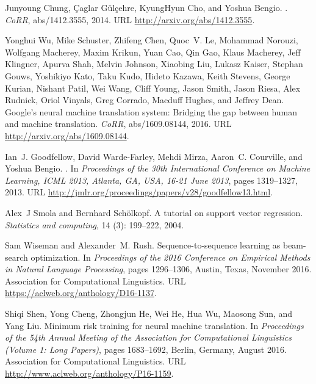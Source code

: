 \documentclass[11pt]{article}
\begin{document}
\begin{thebibliography}{23}
Junyoung Chung, {\c{C}}aglar G{\"{u}}l{\c{c}}ehre, KyungHyun Cho, and Yoshua
  Bengio.
.
\newblock \emph{CoRR}, abs/1412.3555, 2014.
\newblock URL \url{http://arxiv.org/abs/1412.3555}.

Yonghui Wu, Mike Schuster, Zhifeng Chen, Quoc~V. Le, Mohammad Norouzi, Wolfgang
  Macherey, Maxim Krikun, Yuan Cao, Qin Gao, Klaus Macherey, Jeff Klingner,
  Apurva Shah, Melvin Johnson, Xiaobing Liu, Lukasz Kaiser, Stephan Gouws,
  Yoshikiyo Kato, Taku Kudo, Hideto Kazawa, Keith Stevens, George Kurian,
  Nishant Patil, Wei Wang, Cliff Young, Jason Smith, Jason Riesa, Alex Rudnick,
  Oriol Vinyals, Greg Corrado, Macduff Hughes, and Jeffrey Dean.
\newblock Google's neural machine translation system: Bridging the gap between
  human and machine translation.
\newblock \emph{CoRR}, abs/1609.08144, 2016.
\newblock URL \url{http://arxiv.org/abs/1609.08144}.

Ian~J. Goodfellow, David Warde{-}Farley, Mehdi Mirza, Aaron~C. Courville, and
  Yoshua Bengio.
.
\newblock In \emph{Proceedings of the 30th International Conference on Machine
  Learning, {ICML} 2013, Atlanta, GA, USA, 16-21 June 2013}, pages 1319--1327,
  2013.
\newblock URL \url{http://jmlr.org/proceedings/papers/v28/goodfellow13.html}.

Alex~J Smola and Bernhard Sch{\"o}lkopf.
\newblock A tutorial on support vector regression.
\newblock \emph{Statistics and computing}, 14 (3): 199--222,
  2004.

Sam Wiseman and Alexander~M. Rush.
\newblock Sequence-to-sequence learning as beam-search optimization.
\newblock In \emph{Proceedings of the 2016 Conference on Empirical Methods in
  Natural Language Processing}, pages 1296--1306, Austin, Texas, November 2016.
  Association for Computational Linguistics.
\newblock URL \url{https://aclweb.org/anthology/D16-1137}.

Shiqi Shen, Yong Cheng, Zhongjun He, Wei He, Hua Wu, Maosong Sun, and Yang Liu.
\newblock Minimum risk training for neural machine translation.
\newblock In \emph{Proceedings of the 54th Annual Meeting of the Association
  for Computational Linguistics (Volume 1: Long Papers)}, pages 1683--1692,
  Berlin, Germany, August 2016. Association for Computational Linguistics.
\newblock URL \url{http://www.aclweb.org/anthology/P16-1159}.

\end{thebibliography}

  
\end{document}
